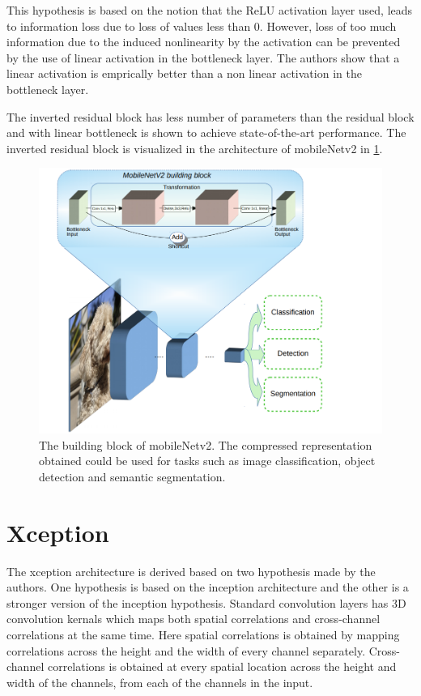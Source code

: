 This hypothesis is based on the notion that the ReLU activation layer used, leads to information loss due to loss of values less than 0. However, loss of too much information due to the induced nonlinearity by the activation can be prevented by the use of linear activation in the bottleneck layer. The authors show that a linear activation is emprically better than a non linear activation in the bottleneck layer.

The inverted residual block has less number of parameters than the residual block and with linear bottleneck is shown to achieve state-of-the-art performance. The inverted residual block is visualized in the architecture of mobileNetv2 in \ref{Fig:mobileNetv2bb}.

	\begin{figure}[!htb]
		\centering
		\includegraphics[width=.7\linewidth]{images/mobileNetv2_bb}
		\caption{The building block of mobileNetv2. The compressed representation obtained could be used for tasks such as image classification, object detection and semantic segmentation.}
		\label{Fig:mobileNetv2bb}
	\end{figure}

\section{Xception}
\label{section:xcep}

The xception architecture is derived based on two hypothesis made by the authors. One hypothesis is based on the inception architecture and the other is a stronger version of the inception hypothesis. Standard convolution layers has 3D convolution kernals which maps both spatial correlations and cross-channel correlations at the same time. Here spatial correlations is obtained by mapping correlations across the height and the width of every channel separately. Cross-channel correlations is obtained at every spatial location across the height and width of the channels, from each of the channels in the input. 

